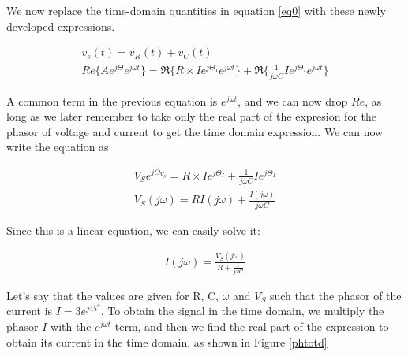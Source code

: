 \documentclass{ximera}
\begin{document}
\begin{example}


We now replace the time-domain quantities in equation \ref{eq0} with
these newly developed expressions.



\begin{eqnarray}
v_s(t)=v_R(t) + v_C(t)  \\
Re\{A e^{j \Theta} e^{j \omega t}\}=    \Re\{R \times I e^{j \Theta_I} e^{j \omega t}\}   +  \Re\{   \frac{1}{j \omega C}  I e^{j \Theta_I}  e^{j \omega t}  \}
\end{eqnarray}

A common term in the previous equation is $ e^{j\omega t}$, and we can now drop $Re$, as long as we later remember to take only the real part of the expresion for the phasor of voltage and current to get the time domain expression. We can now
write the equation as




\begin{eqnarray}
 V_S  e^{j \Theta_{V_S}}  =R \times I e^{j \Theta_I}  +    \frac{1}{j \omega C}  I e^{j \Theta_I}  \\
V_S(j \omega)   = R I(j \omega)    + \frac{I(j \omega )}{j \omega C} 
\end{eqnarray}

\end{example}

Since this is a linear equation, we can easily solve it:


\begin{eqnarray}
I (j \omega) = \frac{V_S(j \omega)}{ R    + \frac{1}{j \omega C} } \label{pheq}
\end{eqnarray} 



Let's say that the values  are given for R, C,  $\omega$  and $V_S$ such that the phasor of the current is  $I=3 e^{j 45^o}$. To obtain the signal in the time domain,  we   multiply the phasor $I$ with the $ e^{j\omega t}$ term, and  then we find
the real part of the expression to obtain its current in the time domain, as shown in Figure \ref{phtotd}
\end{document}
